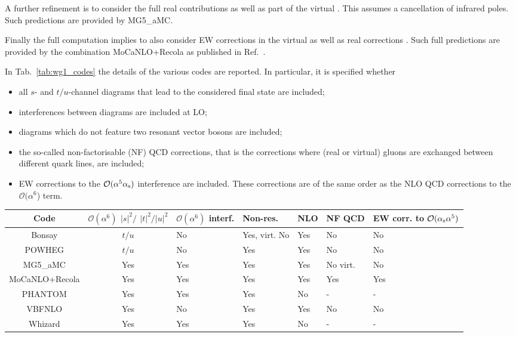 A further refinement is to consider the full real contributions as well as part of the virtual .
This assumes a cancellation of infrared poles.
Such predictions are provided by {\sc MG5\_aMC}.

Finally the full computation implies to also consider EW corrections in the virtual as well as real corrections \cite{Biedermann:2017bss}.
Such full predictions are provided by the combination {\sc MoCaNLO+Recola} as published in Ref.~\cite{Biedermann:2017bss}.

In Tab.~\ref{tab:wg1_codes} the details of the various codes are reported. In particular, it is specified whether
\begin{itemize}
    \item all $s$- and $t/u$-channel diagrams that lead to the considered final state are included;
    \item interferences between diagrams are included at LO;
    \item diagrams which do not feature two resonant vector bosons are included;
    \item the so-called non-factorisable (NF) QCD corrections, that is the corrections where (real or virtual) gluons are exchanged between different quark lines,
        are included;
    \item EW corrections to the $\mathcal O (\alpha^5\alpha_\text{s})$ interference are included. These corrections are of the same order as the NLO QCD corrections to
        the  $\mathcal O (\alpha^6$) term.
\end{itemize}

\begin{table*}[ht!]
    \footnotesize
    \begin{tabularx}{\textwidth}{c|c|X|X|X|X|X}
        Code  &  $\mathcal O(\alpha^6)$ $|s|^2/$ $|t|^2/|u|^2$  &  $\mathcal O(\alpha^6)$ interf.  &  Non-res.  & NLO &  NF QCD  &  EW corr. to $\mathcal O(\alpha_\text{s} \alpha^5)$  \\
        \hline
        \hline
        {\sc Bonsay}        &  $t/u$    &  No       &  Yes, virt. No    &  Yes   & No       &  No  \\
        {\sc POWHEG}        &  $t/u$    &  No       &  Yes              &  Yes   & No       &  No  \\
        {\sc MG5\_aMC}      &  Yes      &  Yes      &  Yes              &  Yes   & No virt. &  No \\
        {\sc MoCaNLO+Recola}&  Yes      &  Yes      &  Yes              &  Yes   & Yes      &  Yes  \\
        {\sc PHANTOM}       &  Yes      &  Yes      &  Yes              &  No    & -        & - \\
        {\sc VBFNLO}        &  Yes      &  No       &  Yes              &  Yes   & No       &  No  \\
        {\sc Whizard}       &  Yes      &  Yes      &  Yes              &  No    & -        & - \\
    \end{tabularx}
    \caption{\label{tab:wg1_codes} Summary of the different properties of the codes employed in the comparison.}
\end{table*}
